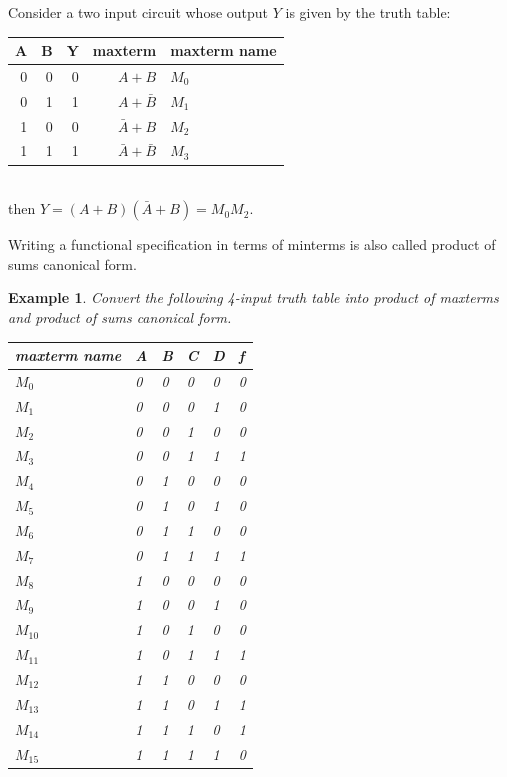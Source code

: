 \documentclass{article}
\newtheorem{example}{Example}
\begin{document}
\noindent Consider a two input circuit whose output $Y$ is given by the truth table:\\
\begin{tabular}{rrrrp{20mm}}
  \toprule
  A & B &  Y & maxterm & maxterm name\\
  \midrule
  0 & 0 &  0 & $A + B$ & $M_0$ \\
  0 & 1 &  1 & $A + \bar{B} $ & $M_1$ \\
  1 & 0 &  0 & $\bar{A} + B$ & $M_2$ \\
  1 & 1 &  1 & $\bar{A} + \bar{B} $ & $M_3$ \\
  \bottomrule
\end{tabular}\\[1em]
then $Y = (A+B)(\bar{A} + B) = M_0M_2$.

\noindent Writing a functional specification in terms of minterms is also called
product of sums canonical form.

\begin{example}
  Convert the following 4-input truth table into product of maxterms and product of sums canonical form.

  \noindent
  \begin{tabular}{p{20mm}llll|l}
    \toprule
    maxterm name & A & B & C & D & f \\
    \midrule
    $M_0$ & 0 & 0 & 0 & 0 & 0 \\ 
    $M_1$ & 0 & 0 & 0 & 1 & 0 \\ 
    $M_2$ & 0 & 0 & 1 & 0 & 0 \\ 
    $M_3$ & 0 & 0 & 1 & 1 & 1 \\ 
    $M_4$ & 0 & 1 & 0 & 0 & 0 \\ 
    $M_5$ & 0 & 1 & 0 & 1 & 0 \\ 
    $M_6$ & 0 & 1 & 1 & 0 & 0 \\ 
    $M_7$ & 0 & 1 & 1 & 1 & 1 \\ 
    $M_8$ & 1 & 0 & 0 & 0 & 0 \\ 
    $M_9$ & 1 & 0 & 0 & 1 & 0 \\ 
    $M_{10}$ & 1 & 0 & 1 & 0 & 0 \\
    $M_{11}$ & 1 & 0 & 1 & 1 & 1 \\
    $M_{12}$ & 1 & 1 & 0 & 0 & 0 \\
    $M_{13}$ & 1 & 1 & 0 & 1 & 1 \\
    $M_{14}$ & 1 & 1 & 1 & 0 & 1 \\
    $M_{15}$ & 1 & 1 & 1 & 1 & 0 \\
    \bottomrule
  \end{tabular}
\end{example}
\end{document}
